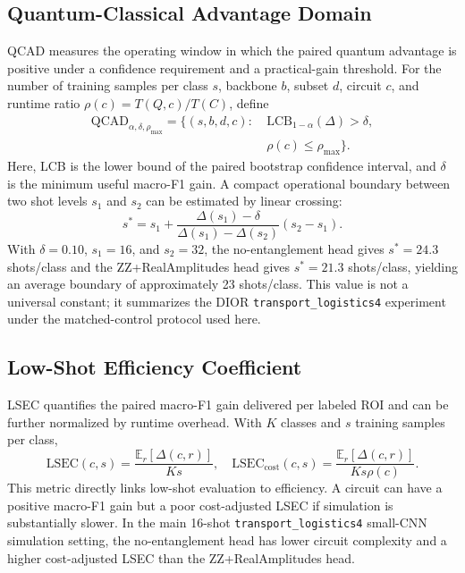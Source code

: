 \documentclass[journal]{IEEEtran}
\newcommand{\TL}{\texttt{transport\_logistics4}}
\begin{document}
\subsection{Quantum-Classical Advantage Domain}
QCAD measures the operating window in which the paired quantum advantage is positive under a confidence requirement and a practical-gain threshold. For the number of training samples per class $s$, backbone $b$, subset $d$, circuit $c$, and runtime ratio $\rho(c)=T(Q,c)/T(C)$, define
\begin{equation}
\begin{split}
\mathrm{QCAD}_{\alpha,\delta,\rho_{\max}}=\{(s,b,d,c):&\ \mathrm{LCB}_{1-\alpha}(\Delta)>\delta,\\
&\ \rho(c)\leq\rho_{\max}\}.
\end{split}
\end{equation}
Here, LCB is the lower bound of the paired bootstrap confidence interval, and $\delta$ is the minimum useful macro-F1 gain. A compact operational boundary between two shot levels $s_1$ and $s_2$ can be estimated by linear crossing:
\begin{equation}
s^*=s_1+\frac{\Delta(s_1)-\delta}{\Delta(s_1)-\Delta(s_2)}(s_2-s_1).
\end{equation}
With $\delta=0.10$, $s_1=16$, and $s_2=32$, the no-entanglement head gives $s^*=24.3$ shots/class and the ZZ+RealAmplitudes head gives $s^*=21.3$ shots/class, yielding an average boundary of approximately 23 shots/class. This value is not a universal constant; it summarizes the DIOR \TL{} experiment under the matched-control protocol used here.

\subsection{Low-Shot Efficiency Coefficient}
LSEC quantifies the paired macro-F1 gain delivered per labeled ROI and can be further normalized by runtime overhead. With $K$ classes and $s$ training samples per class,
\begin{equation}
\mathrm{LSEC}(c,s)=\frac{\mathbb{E}_r[\Delta(c,r)]}{Ks},\quad
\mathrm{LSEC}_{\mathrm{cost}}(c,s)=\frac{\mathbb{E}_r[\Delta(c,r)]}{Ks\rho(c)}.
\end{equation}
This metric directly links low-shot evaluation to efficiency. A circuit can have a positive macro-F1 gain but a poor cost-adjusted LSEC if simulation is substantially slower. In the main 16-shot \TL{} small-CNN simulation setting, the no-entanglement head has lower circuit complexity and a higher cost-adjusted LSEC than the ZZ+RealAmplitudes head.
\end{document}
